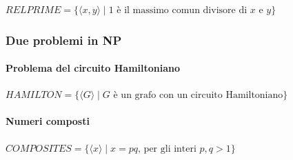 $RELPRIME = \{\langle x,y\rangle\mid 1 \textrm{ è il massimo comun divisore di }x\textrm{ e }y\}$
\subsubsection{Due problemi in NP}
\paragraph{Problema del circuito Hamiltoniano}\nin

$HAMILTON =\{\langle G\rangle\mid G\textrm{ è un grafo con un circuito Hamiltoniano}\}$
\paragraph{Numeri composti}\nin

$COMPOSITES = \{\langle x\rangle\mid x = pq\textrm{, per gli interi }p,q>1\}$
